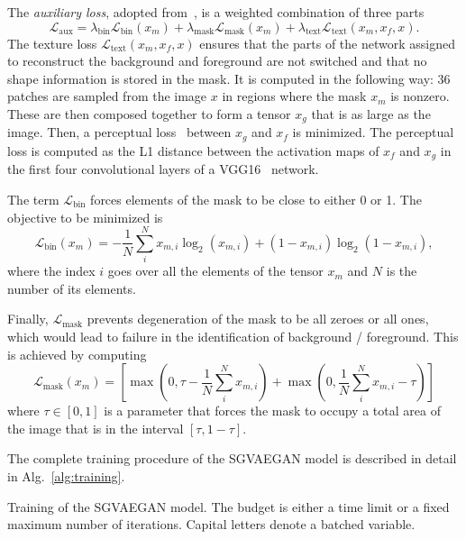 The \emph{auxiliary loss}, adopted from~\cite{sauer2021counterfactual}, is a weighted combination of three parts
\begin{equation} \label{eq:auxloss}
    \mathcal{L}_{\text{aux}} = \lambda_{\text{bin}}\mathcal{L}_{\text{bin}}(x_m) + \lambda_{\text{mask}}\mathcal{L}_{\text{mask}}(x_m) + \lambda_{\text{text}}\mathcal{L}_{\text{text}}(x_m,x_f,x).
\end{equation} 
The texture loss $\mathcal{L}_{\text{text}}(x_m,x_f,x)$ ensures that the parts of the network assigned to reconstruct the background and foreground are not switched and that no shape information is stored in the mask. It is computed in the following way: 36 patches are sampled from the image $x$ in regions where the mask $x_m$ is nonzero. These are then composed together to form a tensor $x_g$ that is as large as the image. Then, a perceptual loss~\cite{johnson2016perceptual} between $x_g$ and $x_f$ is minimized. The perceptual loss is computed as the L1 distance between the activation maps of $x_f$ and $x_g$ in the first four convolutional layers of a VGG16~\cite{simonyan2014very} network.

The term $\mathcal{L}_{\text{bin}}$ forces elements of the mask to be close to either 0 or 1. The objective to be minimized is
\begin{equation}
    \mathcal{L}_{\text{bin}}(x_m) = - \frac{1}{N} \sum_{i}^N x_{m,i} \log_2(x_{m,i}) + (1-x_{m,i}) \log_2(1 - x_{m,i}),
\end{equation}
where the index $i$ goes over all the elements of the tensor $x_m$ and $N$ is the number of its elements.

 Finally, $\mathcal{L}_{\text{mask}}$ prevents degeneration of the mask to be all zeroes or all ones, which would lead to failure in the identification of background / foreground. This is achieved by computing
  \begin{equation}
    \mathcal{L}_{\text{mask}}(x_m) = \left[ \max \left( 0, \tau - \frac{1}{N} \sum_{i}^N x_{m,i} \right) + \max \left( 0, \frac{1}{N} \sum_{i}^N x_{m,i} -\tau  \right) \right]
\end{equation}
where $\tau \in [0,1]$ is a parameter that forces the mask to occupy a total area of the image that is in the interval $[\tau, 1-\tau]$. 

The complete training procedure of the SGVAEGAN model is described in detail in Alg.~\ref{alg:training}.

\begin{algorithm}
\caption{Training of the SGVAEGAN model. The budget is either a time limit or a fixed maximum number of iterations. Capital letters denote a batched variable.}\label{alg:training}

\end{algorithm}

